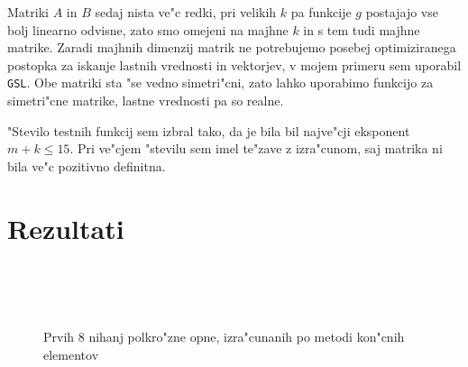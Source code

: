 \documentclass[a4paper,10pt]{article}
\begin{document}
Matriki $A$ in $B$ sedaj nista ve"c redki, pri velikih $k$ pa funkcije $g$ postajajo vse bolj linearno odvisne, zato smo omejeni na majhne $k$ in s tem tudi majhne matrike. Zaradi majhnih dimenzij matrik ne potrebujemo posebej optimiziranega postopka za iskanje lastnih vrednosti in vektorjev, v mojem primeru sem uporabil \texttt{GSL}. Obe matriki sta "se vedno simetri"cni, zato lahko uporabimo funkcijo za simetri"cne matrike, lastne vrednosti pa so realne. 

"Stevilo testnih funkcij sem izbral tako, da je bila bil najve"cji eksponent $m+k \leq 15$. Pri ve"cjem "stevilu sem imel te"zave z izra"cunom, saj matrika ni bila ve"c pozitivno definitna. 

\section{Rezultati}

\begin{figure}[H]
 \centering
  \\
  \\
  \\
 \caption{Prvih 8 nihanj polkro"zne opne, izra"cunanih po metodi kon"cnih elementov}
 \label{fig:nihanja}
\end{figure}


\begin{comment}
 Rezultati relaksacije: 
 
 1 & 3.8403 & 1 & 1 & 3.8317 \\
  2 & 5.1374 & 2 & 1 & 5.1356 \\
  3 & 6.3800 & 3 & 1 & 6.3802 \\
  4 & 7.0284 & 1 & 2 & 7.0156 \\
  5 & 7.5864 & 4 & 1 & 7.5883 \\
  6 & 8.4178 & 2 & 2 & 8.4172 \\
  7 & 8.7673 & 5 & 1 & 8.7715 \\
  8 & 9.7580 & 3 & 2 & 9.7610 \\
\end{comment}
\end{document}
